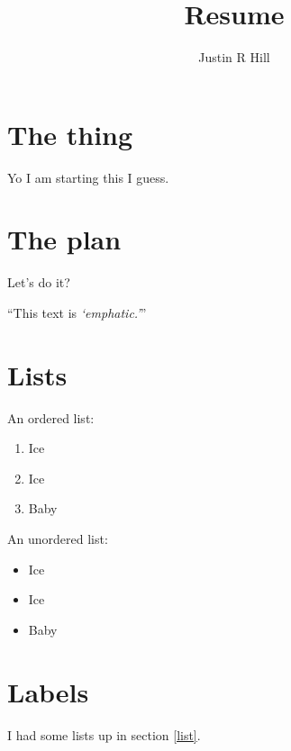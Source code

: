 \documentclass{article}
\author{Justin R Hill}
\title{Resume}
\begin{document}
\maketitle


\section{The thing}

Yo I am starting this I guess.


\section{The plan}

Let's do it?

``This text is {\emph{`emphatic.'}}''


\section{Lists\label{list}}

An ordered list:

\begin{enumerate}
\item Ice
\item Ice
\item Baby
\end{enumerate}

An unordered list:

\begin{itemize}
\item Ice
\item Ice
\item Baby
\end{itemize}


\section{Labels}

I had some lists up in section \ref{list}.
\end{document}
